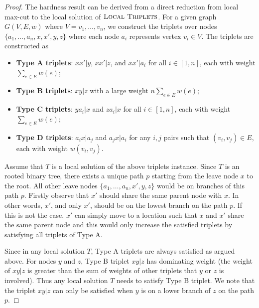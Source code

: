 \documentclass{article}
\theoremstyle{definition}  %
\theoremstyle{plain}
\numberwithin{observation}{section}
\numberwithin{claim}{section}
\numberwithin{fact}{section}
\numberwithin{lemma}{section}
\numberwithin{proposition}{section}
\numberwithin{theorem}{section}
\numberwithin{corollary}{section}
\numberwithin{definition}{section}
\newcommand{\Triplets}{\textsc{Local Triplets}}
\theoremstyle{plain}
\begin{document}
\iffalse
\begin{proof}

    
    The hardness result can be derived from a direct reduction from local max-cut to the local solution of $\Triplets$. For a given graph $G(V, E, w)$ where $V = {v_1, \dots, v_n}$, we construct the triplets over nodes $\{a_1, \dots, a_n, x, x', y, z\}$ where each node $a_i$ represents vertex $v_i \in V$. The triplets are constructed as
    \begin{itemize}
        \item \textbf{Type A triplets}: $xx'|y$, $xx'|z$, and $xx'|a_i$ for all $i \in [1, n]$, each with weight $\sum_{e \in E}w(e)$;
        \item \textbf{Type B triplets}: $xy|z$ with a large weight $n \sum_{e \in E}w(e)$;
        \item \textbf{Type C triplets}: $ya_i|x$ and $za_i|x$ for all $i \in [1, n]$, each with weight $\sum_{e \in E}w(e);$
        \item \textbf{Type D triplets}: $a_ix|a_j$ and $a_jx|a_i$ for any $i, j$ pairs such that $(v_i, v_j) \in E$, each with weight $w(v_i, v_j)$.
    \end{itemize}
    Assume that $T$ is a local solution of the above triplets instance. Since $T$ is an rooted binary tree, there exists a unique path $p$ starting from the leave node $x$ to the root. All other leave nodes $\{a_1, \dots, a_n, x', y, z\}$ would be on branches of this path $p$. Firstly observe that $x'$ should share the same parent node with $x$. In other words, $x'$, and only $x'$, should be on the lowest branch on the path $p$. If this is not the case, $x'$ can simply move to a location such that $x$ and $x'$ share the same parent node and this would only increase the satisfied triplets by satisfying all triplets of Type A.
    
    Since in any local solution $T$, Type A triplets are always satisfied as argued above. For nodes $y$ and $z$, Type B triplet $xy|z$ has dominating weight (the weight of $xy|z$ is greater than the sum of weights of other triplets that $y$ or $z$ is involved). Thus any local solution $T$ needs to satisfy Type B triplet. We note that the triplet $xy|z$ can only be satisfied when $y$ is on a lower branch of $z$ on the path $p$. 


\end{proof}
\end{document}
